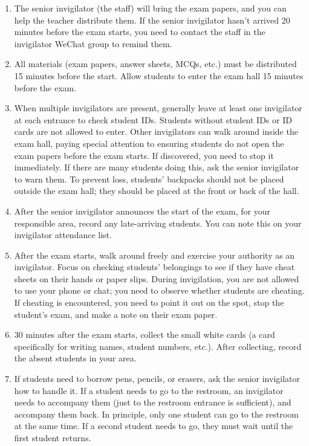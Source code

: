 \begin{enumerate}
    \item The senior invigilator (the staff) will bring the exam papers, and you can help the teacher distribute them. If the senior invigilator hasn't arrived 20 minutes before the exam starts, you need to contact the staff in the invigilator WeChat group to remind them.
    \item All materials (exam papers, answer sheets, MCQs, etc.) must be distributed 15 minutes before the start. Allow students to enter the exam hall 15 minutes before the exam.
    \item When multiple invigilators are present, generally leave at least one invigilator at each entrance to check student IDs. Students without student IDs or ID cards are not allowed to enter. Other invigilators can walk around inside the exam hall, paying special attention to ensuring students do not open the exam papers before the exam starts. If discovered, you need to stop it immediately. If there are many students doing this, ask the senior invigilator to warn them. To prevent loss, students' backpacks should not be placed outside the exam hall; they should be placed at the front or back of the hall.
    \item After the senior invigilator announces the start of the exam, for your responsible area, record any late-arriving students. You can note this on your invigilator attendance list.
    \item After the exam starts, walk around freely and exercise your authority as an invigilator. Focus on checking students' belongings to see if they have cheat sheets on their hands or paper slips. During invigilation, you are not allowed to use your phone or chat; you need to observe whether students are cheating. If cheating is encountered, you need to point it out on the spot, stop the student's exam, and make a note on their exam paper.
    \item 30 minutes after the exam starts, collect the small white cards (a card specifically for writing names, student numbers, etc.). After collecting, record the absent students in your area.
    \item If students need to borrow pens, pencils, or erasers, ask the senior invigilator how to handle it. If a student needs to go to the restroom, an invigilator needs to accompany them (just to the restroom entrance is sufficient), and accompany them back. In principle, only one student can go to the restroom at the same time. If a second student needs to go, they must wait until the first student returns.

\end{enumerate}
